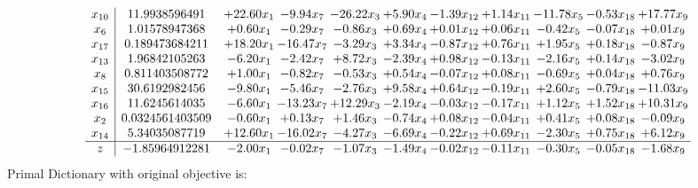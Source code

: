 \documentclass[9pt]{article}
\begin{document}
\[\begin{array}{c| c c@{\hskip 2pt} c@{\hskip 2pt} c@{\hskip 2pt} c@{\hskip 2pt} c@{\hskip 2pt} c@{\hskip 2pt} c@{\hskip 2pt} c@{\hskip 2pt} c@{\hskip 2pt} }
 x_{10}   &  11.9938596491 & + 22.60 x_{1} & -9.94 x_{7} & -26.22 x_{3} & +  5.90 x_{4} & -1.39 x_{12} & +  1.14 x_{11} & -11.78 x_{5} & -0.53 x_{18} & + 17.77 x_{9}\\
 x_{6}   &  1.01578947368 & +  0.60 x_{1} & -0.29 x_{7} & -0.86 x_{3} & +  0.69 x_{4} & +  0.01 x_{12} & +  0.06 x_{11} & -0.42 x_{5} & -0.07 x_{18} & +  0.01 x_{9}\\
 x_{17}   &  0.189473684211 & + 18.20 x_{1} & -16.47 x_{7} & -3.29 x_{3} & +  3.34 x_{4} & -0.87 x_{12} & +  0.76 x_{11} & +  1.95 x_{5} & +  0.18 x_{18} & -0.87 x_{9}\\
 x_{13}   &  1.96842105263 & -6.20 x_{1} & -2.42 x_{7} & +  8.72 x_{3} & -2.39 x_{4} & +  0.98 x_{12} & -0.13 x_{11} & -2.16 x_{5} & +  0.14 x_{18} & -3.02 x_{9}\\
 x_{8}   &  0.811403508772 & +  1.00 x_{1} & -0.82 x_{7} & -0.53 x_{3} & +  0.54 x_{4} & -0.07 x_{12} & +  0.08 x_{11} & -0.69 x_{5} & +  0.04 x_{18} & +  0.76 x_{9}\\
 x_{15}   &  30.6192982456 & -9.80 x_{1} & -5.46 x_{7} & -2.76 x_{3} & +  9.58 x_{4} & +  0.64 x_{12} & -0.19 x_{11} & +  2.60 x_{5} & -0.79 x_{18} & -11.03 x_{9}\\
 x_{16}   &  11.6245614035 & -6.60 x_{1} & -13.23 x_{7} & + 12.29 x_{3} & -2.19 x_{4} & -0.03 x_{12} & -0.17 x_{11} & +  1.12 x_{5} & +  1.52 x_{18} & + 10.31 x_{9}\\
 x_{2}   &  0.0324561403509 & -0.60 x_{1} & +  0.13 x_{7} & +  1.46 x_{3} & -0.74 x_{4} & +  0.08 x_{12} & -0.04 x_{11} & +  0.41 x_{5} & +  0.08 x_{18} & -0.09 x_{9}\\
 x_{14}   &  5.34035087719 & + 12.60 x_{1} & -16.02 x_{7} & -4.27 x_{3} & -6.69 x_{4} & -0.22 x_{12} & +  0.69 x_{11} & -2.30 x_{5} & +  0.75 x_{18} & +  6.12 x_{9}\\
\hline
z    &  -1.85964912281 & -2.00 x_{1} & -0.02 x_{7} & -1.07 x_{3} & -1.49 x_{4} & -0.02 x_{12} & -0.11 x_{11} & -0.30 x_{5} & -0.05 x_{18} & -1.68 x_{9}\\
\end{array}\]
Primal Dictionary with original objective is:
\end{document}
